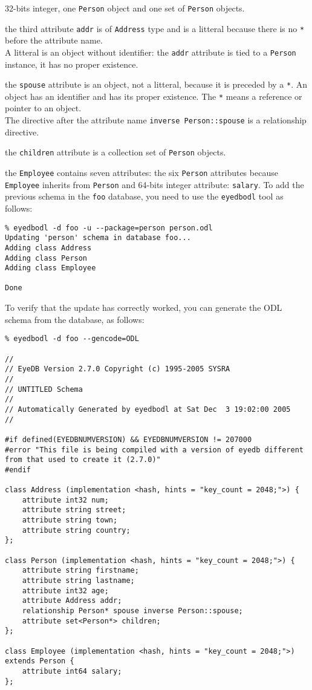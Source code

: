 32-bits integer, one \texttt{Person} object and one set of \texttt{Person}
objects.
\bi
\item the third attribute \texttt{addr} is of \texttt{Address} type and is
a litteral because there is no \texttt{*} before the attribute name.\\
A litteral is an object without identifier: the \texttt{addr} attribute
is tied to a \texttt{Person} instance, it has no proper existence.
\item the \texttt{spouse} attribute is an object, not a litteral, because
it is preceded by a \texttt{*}. An object has an identifier and has its
proper existence. The \texttt{*} means a reference or pointer to an
object.\\
The directive after the attribute name \texttt{inverse Person::spouse}
is a relationship directive.
\item the \texttt{children} attribute is a collection set of
\texttt{Person} objects.
\ei
\item the \texttt{Employee} contains seven attributes: the six \texttt{Person}
attributes because \texttt{Employee} inherits from \texttt{Person} and 
64-bits integer attribute: \texttt{salary}.
\ei
{}
To add the previous schema in the \texttt{foo} database, you need to
use the \texttt{eyedbodl} tool as follows:
\verbsize \begin{verbatim}
% eyedbodl -d foo -u --package=person person.odl
Updating 'person' schema in database foo...
Adding class Address
Adding class Person
Adding class Employee

Done
\end{verbatim}
\normalsize
To verify that the update has correctly worked, you can generate
the ODL schema from the database, as follows:
\verbsize \begin{verbatim}
% eyedbodl -d foo --gencode=ODL

//
// EyeDB Version 2.7.0 Copyright (c) 1995-2005 SYSRA
//
// UNTITLED Schema
//
// Automatically Generated by eyedbodl at Sat Dec  3 19:02:00 2005
//

#if defined(EYEDBNUMVERSION) && EYEDBNUMVERSION != 207000
#error "This file is being compiled with a version of eyedb different from that used to create it (2.7.0)"
#endif

class Address (implementation <hash, hints = "key_count = 2048;">) {
	attribute int32 num;
	attribute string street;
	attribute string town;
	attribute string country;
};

class Person (implementation <hash, hints = "key_count = 2048;">) {
	attribute string firstname;
	attribute string lastname;
	attribute int32 age;
	attribute Address addr;
	relationship Person* spouse inverse Person::spouse;
	attribute set<Person*> children;
};

class Employee (implementation <hash, hints = "key_count = 2048;">) extends Person {
	attribute int64 salary;
};
\end{verbatim}
\normalsize


